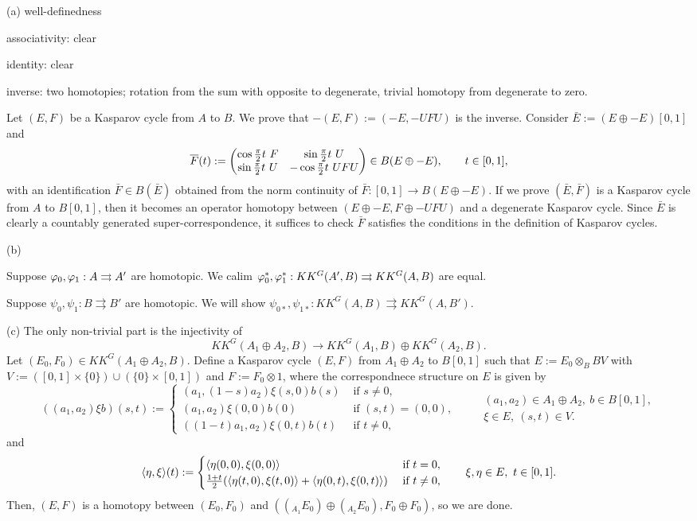 \documentclass{../../large}
\begin{document}
\begin{pf}
(a)
well-definedness

associativity: clear

identity: clear

inverse: two homotopies; rotation from the sum with opposite to degenerate, trivial homotopy from degenerate to zero.

Let $(E,F)$ be a Kasparov cycle from $A$ to $B$.
We prove that $-(E,F):=(-E,-UFU)$ is the inverse.
Consider $\bar E:=(E\oplus-E)[0,1]$ and
\[\bar F(t):=\mat{\cos\frac\pi2t\ F&\sin\frac\pi2t\ U\\\sin\frac\pi2t\ U&-\cos\frac\pi2t\ UFU}\in B(E\oplus-E),\qquad t\in[0,1],\]
with an identification $\bar F\in B(\bar E)$ obtained from the norm continuity of $\bar F:[0,1]\to B(E\oplus-E)$.
If we prove $(\bar E,\bar F)$ is a Kasparov cycle from $A$ to $B[0,1]$, then it becomes an operator homotopy between $(E\oplus-E,F\oplus-UFU)$ and a degenerate Kasparov cycle.
Since $\bar E$ is clearly a countably generated super-correspondence, it suffices to check $\bar F$ satisfies the conditions in the definition of Kasparov cycles.

(b)

Suppose $\varphi_0,\varphi_1:A\rightrightarrows A'$ are homotopic.
We calim $\varphi_0^*,\varphi_1^*:KK^G(A',B)\rightrightarrows KK^G(A,B)$ are equal.

Suppose $\psi_0,\psi_1: B\rightrightarrows B'$ are homotopic.
We will show $\psi_{0*},\psi_{1*}:KK^G(A,B)\rightrightarrows KK^G(A,B')$.


(c)
The only non-trivial part is the injectivity of
\[KK^G(A_1\oplus A_2,B)\to KK^G(A_1,B)\oplus KK^G(A_2,B).\]
Let $(E_0,F_0)\in KK^G(A_1\oplus A_2,B)$.
Define a Kasparov cycle $(E,F)$ from $A_1\oplus A_2$ to $B[0,1]$ such that $E:=E_0\otimes_BBV$ with $V:=([0,1]\times\{0\})\cup(\{0\}\times[0,1])$ and $F:=F_0\otimes1$, where the correspondnece structure on $E$ is given by
\[((a_1,a_2)\xi b)(s,t):=\begin{cases}
(a_1,(1-s)a_2)\xi(s,0)b(s)&\text{ if }s\ne0,\\
(a_1,a_2)\xi(0,0)b(0)&\text{ if }(s,t)=(0,0),\\
((1-t)a_1,a_2)\xi(0,t)b(t)&\text{ if }t\ne0,
\end{cases}
\qquad
\begin{gathered}
(a_1,a_2)\in A_1\oplus A_2,\ b\in B[0,1],\\
\xi\in E,\ (s,t)\in V.
\end{gathered}\]
and
\[\langle\eta,\xi\rangle(t):=\begin{cases}
\langle\eta(0,0),\xi(0,0)\rangle&\text{ if }t=0,\\
\frac{1+t}2(\langle\eta(t,0),\xi(t,0)\rangle+\langle\eta(0,t),\xi(0,t)\rangle)&\text{ if }t\ne0,
\end{cases}
\qquad \xi,\eta\in E,\ t\in[0,1].\]
Then, $(E,F)$ is a homotopy between $(E_0,F_0)$ and $((_{A_1}E_0)\oplus(_{A_2}E_0),F_0\oplus F_0)$, so we are done.
\end{pf}
\end{document}
